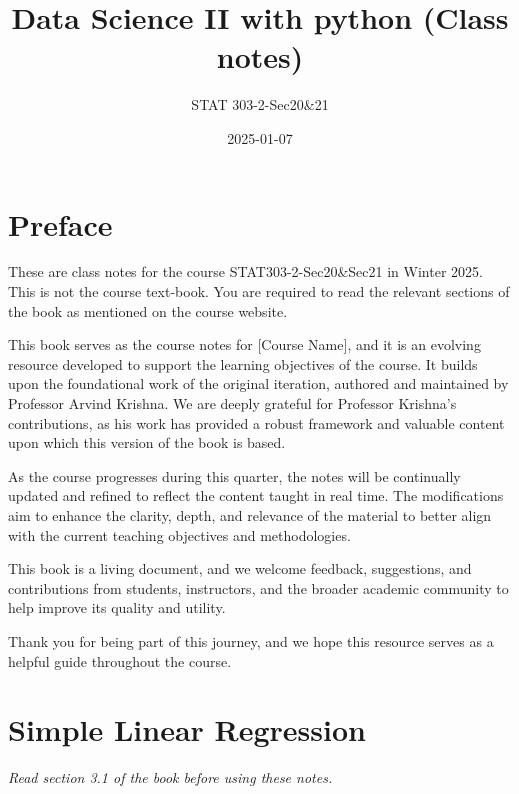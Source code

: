 \documentclass[
  letterpaper,
  DIV=11,
  numbers=noendperiod]{scrreprt}
\title{Data Science II with python (Class notes)}
\subtitle{STAT 303-2-Sec20\&21}
\author{}
\date{2025-01-07}
\renewcommand*\contentsname{Table of contents}
\newcommand\contentsname{Table of contents}
\begin{document}
\maketitle

\renewcommand*\contentsname{Table of contents}
{
\hypersetup{linkcolor=}
\setcounter{tocdepth}{2}
\tableofcontents
}


\chapter*{Preface}\label{preface}


These are class notes for the course STAT303-2-Sec20\&Sec21 in Winter
2025. This is not the course text-book. You are required to read the
relevant sections of the book as mentioned on the course website.

This book serves as the course notes for {[}Course Name{]}, and it is an
evolving resource developed to support the learning objectives of the
course. It builds upon the foundational work of the original iteration,
authored and maintained by Professor Arvind Krishna. We are deeply
grateful for Professor Krishna's contributions, as his work has provided
a robust framework and valuable content upon which this version of the
book is based.

As the course progresses during this quarter, the notes will be
continually updated and refined to reflect the content taught in real
time. The modifications aim to enhance the clarity, depth, and relevance
of the material to better align with the current teaching objectives and
methodologies.

This book is a living document, and we welcome feedback, suggestions,
and contributions from students, instructors, and the broader academic
community to help improve its quality and utility.

Thank you for being part of this journey, and we hope this resource
serves as a helpful guide throughout the course.


\chapter{Simple Linear Regression}\label{simple-linear-regression}

\emph{Read section 3.1 of the book before using these notes.}
\end{document}
